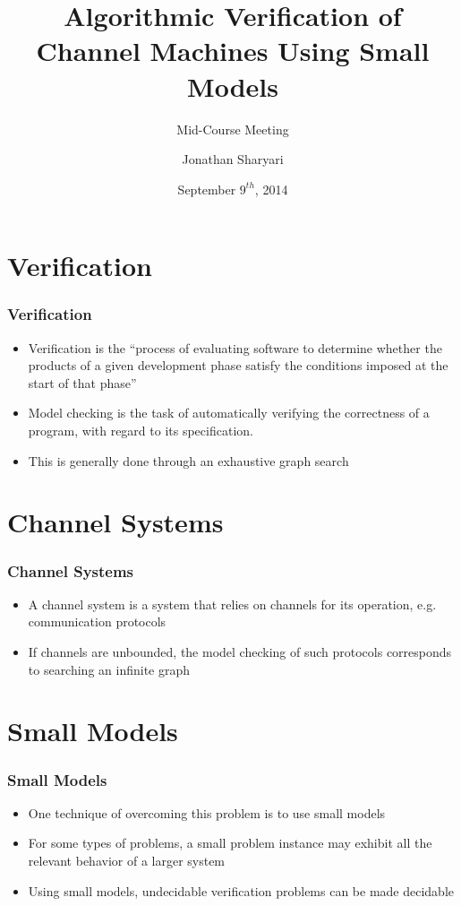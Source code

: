\documentclass{beamer}
\title[Crisis] %
{Algorithmic Verification of Channel Machines Using Small Models}
\author[J, Sharyari | \emph{sharyari@gmail.com}] {Jonathan Sharyari}
\subtitle{Mid-Course Meeting}
\date[2014-09-09] %
{September $9^{th}$, 2014}
\institute[Dept. of Information Technology] %
{
  Department of Information Technology\\
  Uppsala University
}
\begin{document}
\begin{frame}[plain]
  \titlepage
\end{frame}
\section{Verification}
\begin{frame}
  \frametitle{Verification}
  \begin{itemize}
  \item
    Verification is the “process of evaluating software to determine whether the products of a given development phase satisfy the conditions imposed at the start of that phase”\cite{ordbok}
  \item
    Model checking is the task of automatically verifying the correctness of a program, with regard to its specification.
  \item
    This is generally done through an exhaustive graph search
  \end{itemize}
\end{frame}
\section{Channel Systems}
\begin{frame}
  \frametitle{Channel Systems}
  \begin{itemize}
  \item
    A channel system is a system that relies on channels for its operation, e.g. communication protocols
  \item
    If channels are unbounded, the model checking of such protocols corresponds to searching an infinite graph
  \end{itemize}
\end{frame}
\section{Small Models}
\begin{frame}
  \frametitle{Small Models}
  \begin{itemize}
  \item
    One technique of overcoming this problem is to use small models
  \item
    For some types of problems, a small problem instance may exhibit all the relevant behavior of a larger system
  \item
    Using small models, undecidable verification problems can be made decidable
  \end{itemize}
\end{frame}
\end{document}
